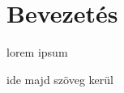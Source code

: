 

\DeclarePairedDelimiter{\norm}{\lVert}{\rVert}



\newcommand{\sumn}[1]{\sum\limits_{{#1}=1}^{n}}
\newcommand{\derivative}[2]{\dfrac{\partial {#1}}{\partial {#2}}}
\newcommand{\subsubsubsection}[1]{\paragraph{#1}\mbox{}\\}





%
%
%
%





\section{Bevezetés}

lorem ipsum

ide majd szöveg kerül


